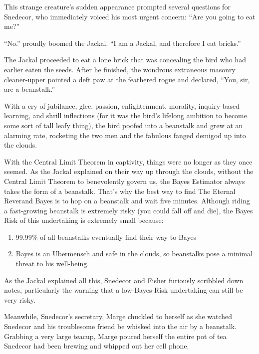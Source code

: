 \documentclass{article}
\begin{document}
This strange creature's sudden appearance prompted several questions for Snedecor, who immediately voiced his most urgent concern: ``Are you going to eat me?'' \newline

``No.'' proudly boomed the Jackal. ``I am a Jackal, and therefore I eat bricks.'' \newline

The Jackal proceeded to eat a lone brick that was concealing the bird who had earlier eaten the seeds. After he finished, the wondrous extraneous masonry cleaner-upper pointed a deft paw at the feathered rogue and declared, ``You, sir, are a beanstalk.'' \newline

With a cry of jubilance, glee, passion, enlightenment, morality, inquiry-based learning, and shrill inflections (for it was the bird's lifelong ambition to become some sort of tall leafy thing), the bird poofed into a beanstalk and grew at an alarming rate, rocketing the two men and the fabulous fanged demigod up into the clouds. \newline

With the Central Limit Theorem in captivity, things were no longer as they once seemed. As the Jackal explained on their way up through the clouds, without the Central Limit Theorem to benevolently govern us, the Bayes Estimator always takes the form of a beanstalk. That's why the best way to find The Eternal Reverand Bayes is to hop on a beanstalk and wait five minutes. Although riding a fast-growing beanstalk is extremely risky (you could fall off and die), the Bayes Risk of this undertaking is extremely small because:

\begin{enumerate}
\item 99.99\% of all beanstalks eventually find their way to Bayes
\item Bayes is an Ubermensch and safe in the clouds, so beanstalks pose a minimal threat to his well-being.
\end{enumerate}
As the Jackal explained all this, Snedecor and Fisher furiously scribbled down notes, particularly the warning that a low-Bayes-Risk undertaking can still be very risky.


Meanwhile, Snedecor's secretary, Marge chuckled to herself as she watched Snedecor and his troublesome friend be whisked into the air by a beanstalk. Grabbing a very large teacup, Marge poured herself the entire pot of tea Snedecor had been brewing and whipped out her cell phone. 
\end{document}
